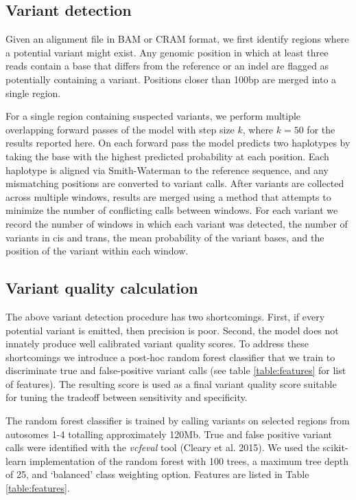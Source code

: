 \documentclass[]{article}
\begin{document}
\subsection{Variant detection}

Given an alignment file in BAM or CRAM format, we first identify regions where a potential variant might exist. Any genomic position in which at least three reads contain a base that differs from the reference or an indel are flagged as potentially containing a variant. Positions closer than 100bp are merged into a single region. 

For a single region containing suspected variants, we perform multiple overlapping forward passes of the model with step size $k$, where $k=50$ for the results reported here. On each forward pass the model predicts two haplotypes by taking the base with the highest predicted probability at each position. Each haplotype is aligned via Smith-Waterman to the reference sequence, and any mismatching positions are converted to variant calls. After variants are collected across multiple windows, results are merged using a method that attempts to minimize the number of conflicting calls between windows. For each variant we record the number of windows in which each variant was detected, the number of variants in cis and trans, the mean probability of the variant bases, and the position of the variant within each window.  


\subsection{Variant quality calculation}

The above variant detection procedure has two shortcomings. First, if every potential variant is emitted, then precision is poor. Second, the model does not innately produce well calibrated variant quality scores. To address these shortcomings we introduce a post-hoc random forest classifier that we train to discriminate true and false-positive variant calls (see table \ref{table:features} for list of features).  The resulting score is used as a final variant quality score suitable for tuning the tradeoff between sensitivity and specificity. 

The random forest classifier is trained by calling variants on selected regions from autosomes 1-4 totalling approximately 120Mb. True and false positive variant calls were identified with the \textit{vcfeval} tool (Cleary et al. 2015). We used the scikit-learn implementation of the random forest with 100 trees, a maximum tree depth of 25, and `balanced' class weighting option. Features are listed in Table \ref{table:features}.
\end{document}
